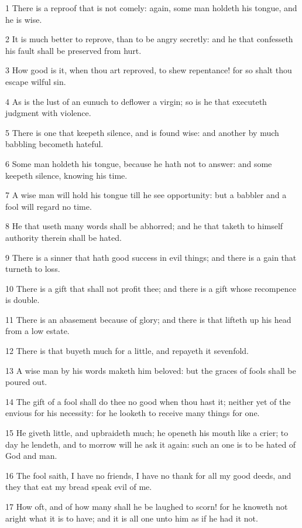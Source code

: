 \par 1 There is a reproof that is not comely: again, some man holdeth his tongue, and he is wise.
\par 2 It is much better to reprove, than to be angry secretly: and he that confesseth his fault shall be preserved from hurt.
\par 3 How good is it, when thou art reproved, to shew repentance! for so shalt thou escape wilful sin.
\par 4 As is the lust of an eunuch to deflower a virgin; so is he that executeth judgment with violence.
\par 5 There is one that keepeth silence, and is found wise: and another by much babbling becometh hateful.
\par 6 Some man holdeth his tongue, because he hath not to answer: and some keepeth silence, knowing his time.
\par 7 A wise man will hold his tongue till he see opportunity: but a babbler and a fool will regard no time.
\par 8 He that useth many words shall be abhorred; and he that taketh to himself authority therein shall be hated.
\par 9 There is a sinner that hath good success in evil things; and there is a gain that turneth to loss.
\par 10 There is a gift that shall not profit thee; and there is a gift whose recompence is double.
\par 11 There is an abasement because of glory; and there is that lifteth up his head from a low estate.
\par 12 There is that buyeth much for a little, and repayeth it sevenfold.
\par 13 A wise man by his words maketh him beloved: but the graces of fools shall be poured out.
\par 14 The gift of a fool shall do thee no good when thou hast it; neither yet of the envious for his necessity: for he looketh to receive many things for one.
\par 15 He giveth little, and upbraideth much; he openeth his mouth like a crier; to day he lendeth, and to morrow will he ask it again: such an one is to be hated of God and man.
\par 16 The fool saith, I have no friends, I have no thank for all my good deeds, and they that eat my bread speak evil of me.
\par 17 How oft, and of how many shall he be laughed to scorn! for he knoweth not aright what it is to have; and it is all one unto him as if he had it not.
